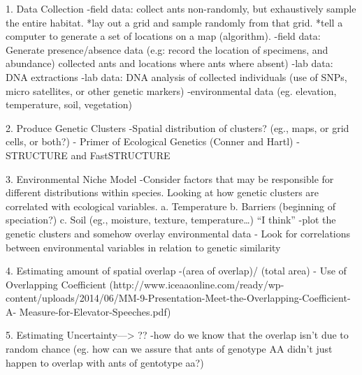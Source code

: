\documentclass[12pt]{article}
\begin{document}
\maketitle

\begin{abstract}
 \ldots
\end{abstract}


1. Data Collection 
	-field data: collect ants non-randomly, but exhaustively sample the 	entire habitat. 
   *lay out a grid and sample randomly from that grid. 
   *tell a computer to generate a set of locations on a map (algorithm). 
	-field data: Generate presence/absence data (e.g: record the 			location of specimens, and abundance)	
	 collected ants and locations where ants where absent)
	-lab data: DNA extractions
	-lab data: DNA analysis of collected individuals (use of SNPs, micro 
	 satellites, or 	
	 other genetic markers)
	-environmental data (eg. elevation, temperature, soil, vegetation)

2. Produce Genetic Clusters
	-Spatial distribution of clusters? (eg., maps, or grid cells, or both?)
    - Primer of Ecological Genetics (Conner and Hartl)
    - STRUCTURE and FastSTRUCTURE

3. Environmental Niche Model
	-Consider factors that may be responsible for different distributions within 	 species. Looking at how genetic clusters are correlated with ecological variables. 
		a. Temperature
		b. Barriers (beginning of speciation?)
		c. Soil (eg., moisture, texture, temperature…)
	“I think”	
	-plot the genetic clusters and somehow overlay environmental data
	- Look for correlations between environmental variables in relation to genetic similarity
  
4. Estimating amount of spatial overlap
	-(area of overlap)/ (total area)
	- Use of Overlapping Coefficient (http://www.iceaaonline.com/ready/wp-	
	content/uploads/2014/06/MM-9-Presentation-Meet-the-Overlapping-Coefficient-A-	Measure-for-Elevator-Speeches.pdf) 

5. Estimating Uncertainty—> ?? 
	-how do we know that the overlap isn’t due to random chance (eg. how can we 	assure that ants of genotype AA didn’t just happen to overlap with ants of 		gentotype aa?) 

	



\end{document}
